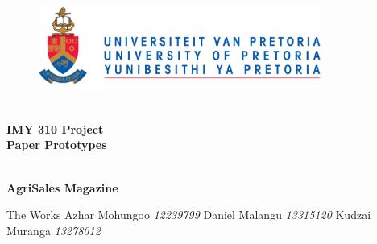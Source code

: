 \begin{titlepage}
	\begin{center}
		
		\begin{figure}[t]
			\centering
			\includegraphics[width=350px]{../Images/UP_Logo.png}
		\end{figure}
		
		\textsc{\large } \\ 
		\vspace{2cm}
		\textbf{\Huge IMY 310 Project \\ [0.25cm]
			Paper Prototypes} \\ 

		\textsc{\large } \\ 
		\vspace{0.75cm}

		\textbf{\Large AgriSales Magazine} \\ 
		
		\begin{flushright} \large
			The Works \emph{} \newline
			\newline 
			Azhar Mohungoo \emph{12239799} \newline
			Daniel Malangu \emph{13315120} \newline
			Kudzai Muranga 	\emph{13278012} \newline
			\end{flushright}
		
	\end{center}
\end{titlepage}
